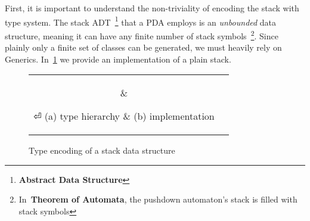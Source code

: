 First, it is important to understand the non-triviality of encoding the stack with \Java type system.
  The stack ADT~\footnote{\textbf{Abstract Data Structure}} that a PDA employs is an \emph{unbounded} data structure,
  meaning it can have any finite number of stack symbols~\footnote{In~\textbf{Theorem of Automata}, the pushdown automaton's stack is filled with stack symbols}.
Since plainly only a finite set of \Java classes can be generated, we must heavily rely on \Java Generics.
In~\cref{Figure:stack:encoding} we provide an implementation of a plain stack.

\begin{figure}[htb]
  \caption{\label{Figure:stack:encoding} Type encoding of a stack data structure} 
    \begin{tabular}{cc}
      \hspace{-12ex}
         \parbox[c]{0.3\linewidth}{%
          
        }
          &
         \parbox[c]{0.86\linewidth}{%
      }
⏎
      \hspace{-12ex} (a) type hierarchy & (b) implementation
    \end{tabular}
\end{figure}
